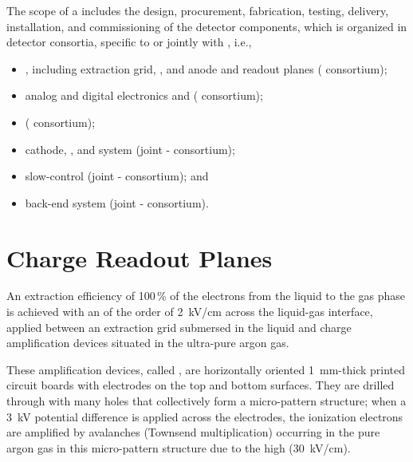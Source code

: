 The scope of a  includes the design, procurement, fabrication, testing, delivery, installation, and commissioning of the detector components, which is organized in detector consortia, specific to  or jointly with , i.e., 

\begin{itemize}
\item {}, including extraction grid, , and anode and readout planes ( consortium);
\item analog and digital electronics and  ( consortium); 
\item {} ( consortium);
\item cathode, , and  system (joint - consortium);  
\item slow-control (joint - consortium); and
\item back-end  system (joint - consortium).
\end{itemize}



\section{Charge Readout Planes}
\label{sec:dp-execsum-crp}

An extraction efficiency of \num{100}\,\% of the electrons from the liquid to the gas phase is achieved with an \efield of the order of \SI{2}{kV/cm} across the liquid-gas interface, applied between an  extraction grid submersed in the liquid and charge amplification  devices situated in the ultra-pure argon gas. 

These amplification devices, called , are horizontally  oriented \SI{1}{mm}-thick printed  circuit boards with electrodes on the top and bottom surfaces. They are drilled through with many holes that collectively form a micro-pattern structure;  when a \SI{3}{kV} potential difference is applied across the electrodes, the ionization electrons are amplified by avalanches (Townsend multiplication) occurring in the  pure argon gas in this micro-pattern structure due to the high \efield (\SI{30}{kV/cm}).

